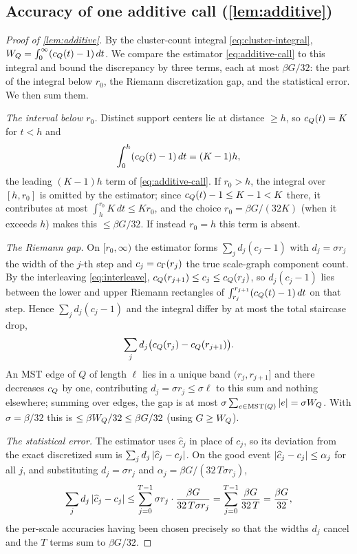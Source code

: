 \subsection{Accuracy of one additive call (\texorpdfstring{\cref{lem:additive}}{additive})}\label{sec:app-accuracy}

\begin{proof}[Proof of \cref{lem:additive}]
By the cluster-count integral \eqref{eq:cluster-integral}, $W_Q=\int_0^\infty(c_Q(t)-1)\,dt$. We compare
the estimator \eqref{eq:additive-call} to this integral and bound the discrepancy by three terms, each at
most $\beta G/32$: the part of the integral below $r_0$, the Riemann discretization gap, and the
statistical error. We then sum them.

\emph{The interval below $r_0$.} Distinct support centers lie at distance $\ge h$, so $c_Q(t)=K$ for $t<h$
and
\[
  \int_0^h(c_Q(t)-1)\,dt=(K-1)h,
\]
the leading $(K-1)h$ term of \eqref{eq:additive-call}. If $r_0>h$, the integral over $[h,r_0]$ is omitted
by the estimator; since $c_Q(t)-1\le K-1<K$ there, it contributes at most $\int_h^{r_0}K\,dt\le Kr_0$, and
the choice $r_0=\beta G/(32K)$ (when it exceeds $h$) makes this $\le\beta G/32$. If instead $r_0=h$ this
term is absent.

\emph{The Riemann gap.} On $[r_0,\infty)$ the estimator forms $\sum_j d_j(c_j-1)$ with $d_j=\sigma r_j$ the
width of the $j$-th step and $c_j=c_\Gamma(r_j)$ the true scale-graph component count. By the interleaving
\eqref{eq:interleave}, $c_Q(r_{j+1})\le c_j\le c_Q(r_j)$, so $d_j(c_j-1)$ lies between the lower and upper
Riemann rectangles of $\int_{r_j}^{r_{j+1}}(c_Q(t)-1)\,dt$ on that step. Hence $\sum_j d_j(c_j-1)$ and the
integral differ by at most the total staircase drop,
\[
  \sum_j d_j\bigl(c_Q(r_j)-c_Q(r_{j+1})\bigr).
\]
An MST edge of $Q$ of length $\ell$ lies in a unique band $(r_j,r_{j+1}]$ and there decreases $c_Q$ by one,
contributing $d_j=\sigma r_j\le\sigma\ell$ to this sum and nothing elsewhere; summing over edges, the gap
is at most $\sigma\sum_{e\in\mathrm{MST}(Q)}\left|e\right|=\sigma W_Q$. With $\sigma=\beta/32$ this is $\le\beta W_Q/32\le
\beta G/32$ (using $G\ge W_Q$).

\emph{The statistical error.} The estimator uses $\widehat c_j$ in place of $c_j$, so its deviation from
the exact discretized sum is $\sum_j d_j\left|\widehat c_j-c_j\right|$. On the good event $\left|\widehat c_j-c_j\right|
\le\alpha_j$ for all $j$, and substituting $d_j=\sigma r_j$ and $\alpha_j=\beta G/(32\,T\sigma r_j)$,
\[
  \sum_j d_j\left|\widehat c_j-c_j\right|\le\sum_{j=0}^{T-1}\sigma r_j\cdot\frac{\beta G}{32\,T\sigma r_j}
   =\sum_{j=0}^{T-1}\frac{\beta G}{32\,T}=\frac{\beta G}{32},
\]
the per-scale accuracies having been chosen precisely so that the widths $d_j$ cancel and the $T$ terms
sum to $\beta G/32$.


\end{proof}
